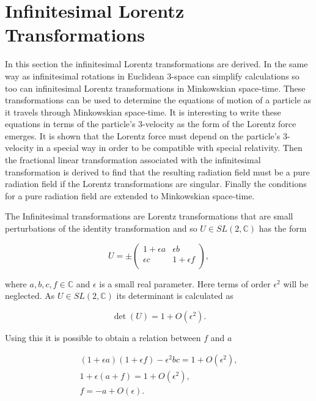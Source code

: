 \section{Infinitesimal Lorentz Transformations}

In this section the infinitesimal Lorentz transformations are derived. In the same way as infinitesimal rotations in Euclidean $3$-space can simplify calculations so too can infinitesimal Lorentz transformations in Minkowskian space-time. These transformations can be used to determine the equations of motion of a particle as it travels through Minkowskian space-time. It is interesting to write these equations in terms of the particle's $3$-velocity as the form of the Lorentz force emerges. It is shown that the Lorentz force must depend on the particle's $3$-velocity in a special way in order to be compatible with special relativity. Then the fractional linear transformation associated with the infinitesimal transformation is derived to find that the resulting radiation field must be a pure radiation field if the Lorentz transformations are singular. Finally the conditions for a pure radiation field are extended to Minkowskian space-time.

The Infinitesimal transformations are Lorentz transformations that are small perturbations of the identity transformation and so $U \in SL(2,\mathbb{C})$ has the form \cite[p. 86]{Relativity_Synge}

\begin{equation}\label{Infinitesimal_Infinitesimal_Lorentz_Transform_Matrix_U}
U = \pm
\left(
\begin{array}{cc}
1 + \epsilon a & \epsilon b \\
\epsilon c & 1 + \epsilon f \\
\end{array}
\right),
\end{equation}

\noindent where $a,b,c,f \in \mathbb{C}$ and $\epsilon$ is a small real parameter. Here terms of order $\epsilon^2$ will be neglected. As $U \in SL(2,\mathbb{C})$ its determinant is calculated as

\begin{equation*}
\det{(U)} = 1 + O(\epsilon^2).
\end{equation*}

\noindent Using this it is possible to obtain a relation between $f$ and $a$

\begin{gather*}
(1 + \epsilon a)(1 + \epsilon f) - \epsilon^2 b c = 1 + O(\epsilon^2), \\
1 + \epsilon (a +f) = 1 + O(\epsilon^2), \\
f = -a + O(\epsilon).
\end{gather*}

